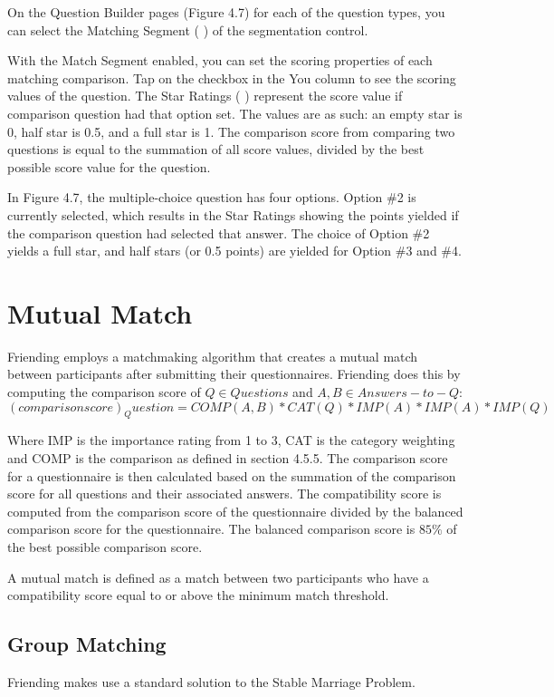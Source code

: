 \documentclass[a4paper,11pt,titlepage]{scrartcl}
\newcommand{\textapp}[1]{{\fontfamily{cmss}\selectfont#1}}
\newcommand{\Friending}{\textapp{Friending}}
\begin{document}
On the Question Builder pages (Figure 4.7) for each of the question types, you can select the Matching Segment ( ) of the segmentation control.   

With the Match Segment enabled, you can set the scoring properties of each matching comparison.  Tap on the checkbox in the You column to see the scoring values of the question.  The Star Ratings ( ) represent the score value if comparison question had that option set.  The values are as such: an empty star is 0, half star is 0.5, and a full star is 1.  The comparison score from comparing two questions is equal to the summation of all score values, divided by the best possible score value for the question.

In Figure 4.7, the multiple-choice question has four options.  Option \#2 is currently selected, which results in the Star Ratings showing the points yielded if the comparison question had selected that answer.  The choice of Option \#2 yields a full star, and half stars (or 0.5 points) are yielded for Option \#3 and \#4.   

\clearpage
\section{Mutual Match}
\label{sec:matching}
\Friending{} employs a matchmaking algorithm that creates a mutual match between participants after submitting their questionnaires.  \Friending{} does this by computing the comparison score of $Q \in Questions$ and $A,B \in Answers-to-Q$:
\begin{equation}
(comparison score)_Question = COMP(A,B)*CAT(Q)*IMP(A)*IMP(A)*IMP(Q) 
\end{equation}

Where IMP is the importance rating from 1 to 3, CAT is the category weighting and COMP is the comparison as defined in section 4.5.5.   The comparison score for a questionnaire is then calculated based on the summation of the comparison score for all questions and their associated answers.
The compatibility score is computed from the comparison score of the questionnaire divided by the balanced comparison score for the questionnaire.  The balanced comparison score is $85\%$ of the best possible comparison score.

A mutual match is defined as a match between two participants who have a compatibility score equal to or above the minimum match threshold.  

\subsection{Group Matching}
\label{sec:groupmatch}
\Friending{} makes use a standard solution to the Stable Marriage Problem.
\end{document}
